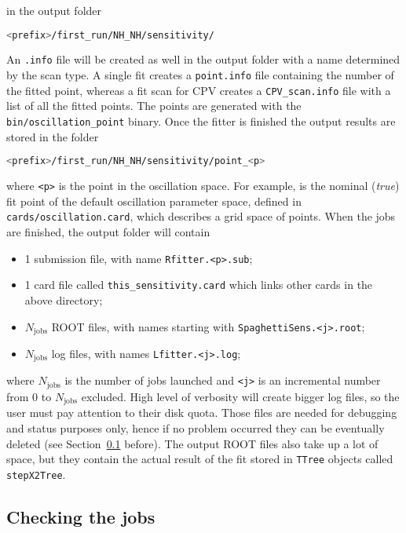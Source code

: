 \documentclass[a4paper, 11pt]{article}
\newcommand{\refsec}[1]{Section~\ref{#1}}
\begin{document}
in the output folder
\begin{lstlisting}[language=bash]
	<prefix>/first_run/NH_NH/sensitivity/
\end{lstlisting}
An \texttt{.info} file will be created as well in the output folder with a name determined %
by the scan type.
A single fit creates a \texttt{point.info} file containing the number of the fitted point, %
whereas a fit scan for CPV creates a \texttt{CPV\_scan.info} file with a list of all the %
fitted points.
The points are generated with the \texttt{bin/oscillation\_point} binary.
Once the fitter is finished the output results are stored in the folder %
\begin{lstlisting}[language=bash]
	<prefix>/first_run/NH_NH/sensitivity/point_<p>
\end{lstlisting}
where \texttt{<p>} is the point in the oscillation space.
For example,  is the nominal (\emph{true}) fit point of the default oscillation %
parameter space, defined in \texttt{cards/oscillation.card}, %
which describes a grid space of  points.
When the jobs are finished, the output folder will contain
\begin{itemize}
		\small
	\item 1 submission file, with name \texttt{Rfitter.<p>.sub};
	\item 1 card file called \texttt{this\_sensitivity.card} which links other cards %
		in the above directory;
	\item $N_\text{jobs}$ ROOT files, with names starting with \texttt{SpaghettiSens.<j>.root};
	\item $N_\text{jobs}$ log files, with names \texttt{Lfitter.<j>.log};
\end{itemize}
where $N_\text{jobs}$ is the number of jobs launched and \texttt{<j>} is an incremental number %
from 0 to $N_\text{jobs}$ excluded.
High level of verbosity will create bigger log files, so the user must pay attention to their disk quota.
Those files are needed for debugging and status purposes only, %
hence if no problem occurred they can be eventually deleted (see \refsec{sec:complete} before).
The output ROOT files also take up a lot of space, but they contain the actual result of the fit %
stored in \texttt{TTree} objects called \texttt{stepX2Tree}.

\subsection{Checking the jobs}
\label{sec:complete}
\end{document}

